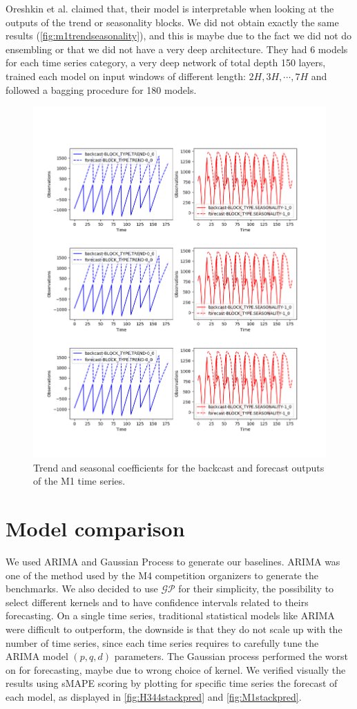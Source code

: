 \documentclass{article}
\begin{document}
Oreshkin et al. claimed that, their model is interpretable when looking at the outputs of the trend or seasonality blocks. We did not obtain exactly the same results (\autoref{fig:m1trendseasonality}), and this is maybe due to the fact we did not
do ensembling or that we did not have a very deep architecture. They had 6 models for each time series category,  a very deep network of total depth 150 layers, trained each model on input windows of
different length: $2H,3H, \cdots, 7H$ and followed a bagging procedure for 180 models.

\begin{figure}[!ht]
\centering
	\includegraphics[width=0.8\columnwidth]{M1_stack_reload_100.png} 
\caption{Trend and seasonal coefficients for the backcast and forecast outputs of the M1 time series.}
\label{fig:m1trendseasonality}
\end{figure}


\section{Model comparison}
\label{modelcomparison}

We used ARIMA and Gaussian Process to generate our baselines. ARIMA was one of the method used by the M4 competition organizers to generate the benchmarks.
We also decided to use $\mathcal{GP}$ for their simplicity, the possibility to select different kernels and to have confidence intervals related to theirs forecasting.
On a single time series, traditional statistical models like ARIMA were difficult to outperform, the downside is that they do not scale up with the number of time series, since each time series requires to carefully
tune the ARIMA model $(p,q,d)$ parameters. The Gaussian process performed the worst on for forecasting, maybe due to wrong choice of kernel.
We verified visually the results using sMAPE  scoring by plotting for specific time series the forecast of each model, as displayed in \autoref{fig:H344stackpred} and \autoref{fig:M1stackpred}.
\end{document}
